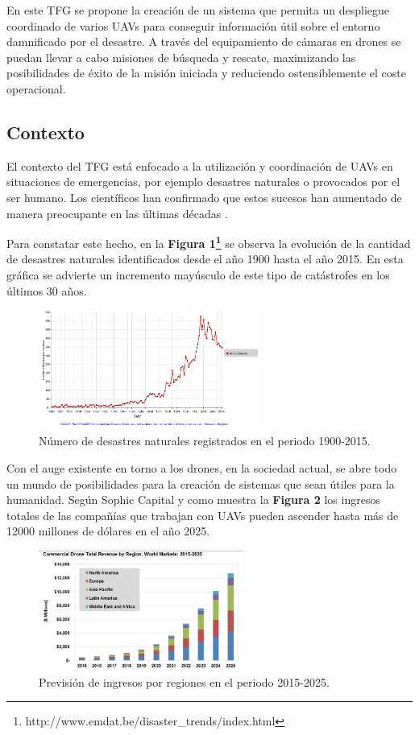\documentclass{pre-tfg}
\begin{document}
En este TFG se propone la creación de un sistema que permita un despliegue coordinado de varios UAVs para conseguir información útil sobre el entorno damnificado por el desastre. A través del equipamiento de cámaras en drones se puedan llevar a cabo misiones de búsqueda y rescate, maximizando las posibilidades de éxito de la misión iniciada y reduciendo ostensiblemente el coste operacional.

\subsection{Contexto}

El contexto del TFG está enfocado a la utilización y coordinación de UAVs en situaciones de emergencias, por ejemplo desastres naturales o provocados por el ser humano. Los científicos han confirmado que estos sucesos han aumentado de manera preocupante en las últimas décadas \cite{aumento}.

Para constatar este hecho, en la \textbf{Figura 1\footnote{http://www.emdat.be/disaster\_trends/index.html}} se observa la evolución de la cantidad de desastres naturales identificados desde el año 1900 hasta el año 2015. En esta gráfica se advierte un incremento mayúsculo de este tipo de catástrofes en los últimos 30 años.

\begin{figure}[htb]
\centering
\includegraphics[width=0.65\textwidth]{./figures/catastrofesnaturales.png}
\caption{Número de desastres naturales registrados en el periodo 1900-2015.}
\end{figure}

Con el auge existente en torno a los drones, en la sociedad actual, se abre todo un mundo de posibilidades para la creación de sistemas que sean útiles para la humanidad. Según Sophic Capital y como muestra la \textbf{Figura 2} \cite{cuotamercado} los ingresos totales de las compañías que trabajan con UAVs pueden ascender hasta más de 12000 millones de dólares en el año 2025.


\begin{figure}[htb]
\centering
\includegraphics[width=0.60\textwidth]{./figures/DCA-15-chart.png}
\caption{Previsión de ingresos por regiones en el periodo 2015-2025.}
\end{figure} 
\end{document}
